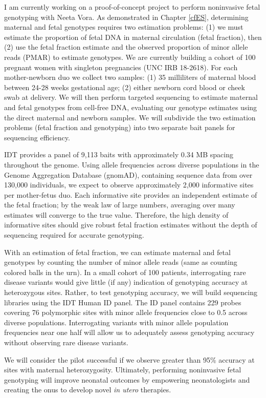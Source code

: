 \documentclass[11pt,letterpaper,oneside]{book}
\begin{document}
I am currently working on a proof-of-concept project to perform noninvasive fetal genotyping with Neeta Vora.
As demonstrated in Chapter \ref{cfES}, determining maternal and fetal genotypes requires two estimation problems: (1) we must estimate the proportion of fetal DNA in maternal circulation (fetal fraction), then (2) use the fetal fraction estimate and the observed proportion of minor allele reads (PMAR) to estimate genotypes.
We are currently building a cohort of 100 pregnant women with singleton pregnancies (UNC IRB 18-2618).
For each mother-newborn duo we collect two samples: (1) 35 milliliters of maternal blood between 24-28 weeks gestational age; (2) either newborn cord blood or cheek swab at delivery.
We will then perform targeted sequencing to estimate maternal and fetal genotypes from cell-free DNA, evaluating our genotype estimates using the direct maternal and newborn samples.
We will subdivide the two estimation problems (fetal fraction and genotyping) into two separate bait panels for sequencing efficiency.

IDT provides a panel of 9,113 baits with approximately 0.34 MB spacing throughout the genome.
Using allele frequencies across diverse populations in the Genome Aggregation Database (gnomAD), containing sequence data from over 130,000 individuals, we expect to observe approximately 2,000 informative sites per mother-fetus duo.
Each informative site provides an independent estimate of the fetal fraction; by the weak law of large numbers, averaging over many estimates will converge to the true value.
Therefore, the high density of informative sites should give robust fetal fraction estimates without the depth of sequencing required for accurate genotyping.

With an estimation of fetal fraction, we can estimate maternal and fetal genotypes by counting the number of minor allele reads (same as counting colored balls in the urn).
In a small cohort of 100 patients, interrogating rare disease variants would give little (if any) indication of genotyping accuracy at heterozygous sites.
Rather, to test genotyping accuracy, we will build sequencing libraries using the IDT Human ID panel.
The ID panel contains 229 probes covering 76 polymorphic sites with minor allele frequencies close to 0.5 across diverse populations.
Interrogating variants with minor allele population frequencies near one half will allow us to adequately assess genotyping accuracy without observing rare disease variants.

We will consider the pilot successful if we observe greater than 95\% accuracy at sites with maternal heterozygosity.
Ultimately, performing noninvasive fetal genotyping will improve neonatal outcomes by empowering neonatologists and creating the onus to develop novel \emph{in utero} therapies.
\end{document}
